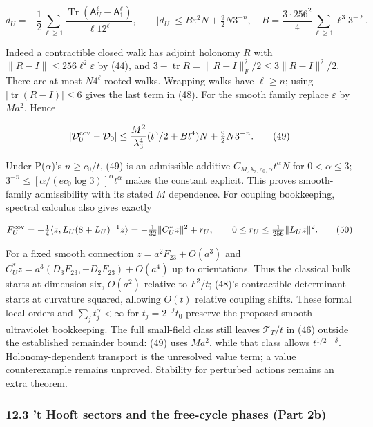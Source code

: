 \documentclass[11pt,a4paper]{article}
\begin{document}
\[d_U=-\frac12\sum_{\ell\ge1}
\frac{\operatorname{Tr}(\mathsf A_U^\ell-\mathsf A_1^\ell)}{\ell12^\ell},
\qquad |d_U|\le B\varepsilon^2N+\tfrac92N3^{-n},\quad
B=\frac{3\cdot256^2}{4}\sum_{\ell\ge1}\ell^3 3^{-\ell}.\tag{48}\]

Indeed a contractible closed walk has adjoint holonomy \(R\) with
\(\|R-I\|\le256\ell^2\varepsilon\) by (44), and
\(3-\operatorname{tr}R=\|R-I\|_F^2/2\le3\|R-I\|^2/2\). There are at most
\(N4^\ell\) rooted walks. Wrapping walks have \(\ell\ge n\); using
\(|\operatorname{tr}(R-I)|\le6\) gives the last term in (48). For the
smooth family replace \(\varepsilon\) by \(Ma^2\). Hence

\[|\mathcal D_0^{\rm cov}-\mathcal D_0|
\le\frac{M^2}{\lambda_3^4}(t^3/2+Bt^4)N+\tfrac92N3^{-n}.
\tag{49}\]

Under P(\(\alpha\))'s \(n\ge c_0/t\), (49) is an admissible additive
\(C_{M,\lambda_3,c_0,\alpha}t^\alpha N\) for \(0<\alpha\le3\);
\(3^{-n}\le[\alpha/(e c_0\log3)]^\alpha t^\alpha\) makes the constant
explicit. This proves smooth-family admissibility with its stated \(M\)
dependence. For coupling bookkeeping, spectral calculus also gives
exactly

\[F_U^{\rm cov}=-\tfrac14\langle z,L_U(8+L_U)^{-1}z\rangle
=-\tfrac1{32}\|C_U^*z\|^2+r_U,\qquad
0\le r_U\le\tfrac1{256}\|L_Uz\|^2.\tag{50}\]

For a fixed smooth connection \(z=a^2F_{23}+O(a^3)\) and
\(C_U^*z=a^3(D_3F_{23},-D_2F_{23})+O(a^4)\) up to orientations. Thus the
classical bulk starts at dimension six, \(O(a^2)\) relative to
\(F^2/t\); (48)'s contractible determinant starts at curvature squared,
allowing \(O(t)\) relative coupling shifts. These formal local orders
and \(\sum_jt_j^\alpha<\infty\) for \(t_j=2^{-j}t_0\) preserve the
proposed smooth ultraviolet bookkeeping. The full small-field class
still leaves \(\mathcal T_T/t\) in (46) outside the established
remainder bound: (49) uses \(Ma^2\), while that class allows
\(t^{1/2-\delta}\). Holonomy-dependent transport is the unresolved value
term; a value counterexample remains unproved. Stability for perturbed
actions remains an extra theorem.

\hypertarget{t-hooft-sectors-and-the-free-cycle-phases-part-2b}{%
\subsubsection{12.3 't Hooft sectors and the free-cycle phases (Part
2b)}\label{t-hooft-sectors-and-the-free-cycle-phases-part-2b}}
\end{document}
